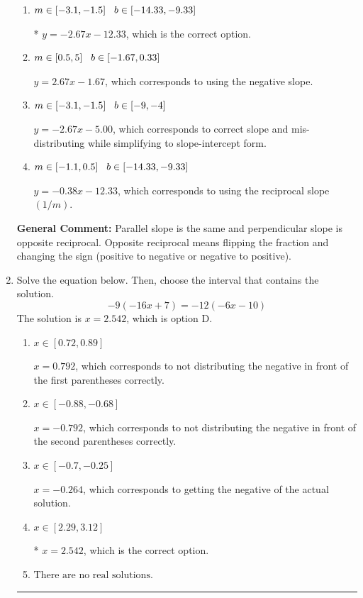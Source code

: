\documentclass{extbook}[14pt]
\newcommand{\litem}[1]{\item #1

\rule{\textwidth}{0.4pt}}
\begin{document}
\begin{enumerate}
{\begin{enumerate}[label=\Alph*.]
 $y = -2.67x + 12.33$, which corresponds to using the correct slope and getting the negative $y$-intercept.
\item \( m \in [-3.1, -1.5] \hspace*{3mm} b \in [-14.33, -9.33] \)

* $y = -2.67x - 12.33$, which is the correct option.
\item \( m \in [0.5, 5] \hspace*{3mm} b \in [-1.67, 0.33] \)

 $y = 2.67x - 1.67$, which corresponds to using the negative slope.
\item \( m \in [-3.1, -1.5] \hspace*{3mm} b \in [-9, -4] \)

 $y = -2.67x - 5.00$, which corresponds to correct slope and mis-distributing while simplifying to slope-intercept form.
\item \( m \in [-1.1, 0.5] \hspace*{3mm} b \in [-14.33, -9.33] \)

 $y = -0.38x - 12.33$, which corresponds to using the reciprocal slope $(1/m)$.
\end{enumerate}

\textbf{General Comment:} Parallel slope is the same and perpendicular slope is opposite reciprocal. Opposite reciprocal means flipping the fraction and changing the sign (positive to negative or negative to positive).
}
\litem{
Solve the equation below. Then, choose the interval that contains the solution.
\[ -9(-16x + 7) = -12(-6x -10) \]The solution is \( x = 2.542 \), which is option D.\begin{enumerate}[label=\Alph*.]
\item \( x \in [0.72, 0.89] \)

$x = 0.792$, which corresponds to not distributing the negative in front of the first parentheses correctly.
\item \( x \in [-0.88, -0.68] \)

$x = -0.792$, which corresponds to not distributing the negative in front of the second parentheses correctly.
\item \( x \in [-0.7, -0.25] \)

$x = -0.264$, which corresponds to getting the negative of the actual solution.
\item \( x \in [2.29, 3.12] \)

* $x = 2.542$, which is the correct option.
\item \( \text{There are no real solutions.} \)


\end{enumerate}}
\end{enumerate}
\end{document}
